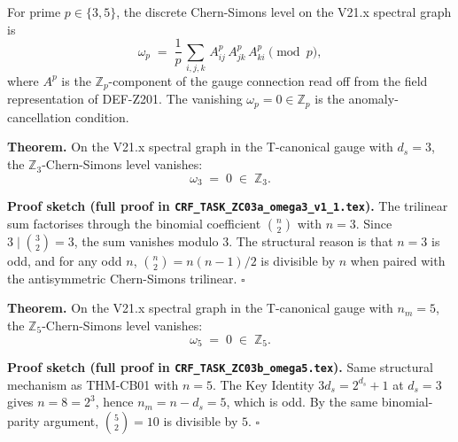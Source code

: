 \documentclass[12pt, a4paper]{article}
\begin{document}
\begin{formalbox}[title={The $\omega_p$ Anomaly Integral (Setup)}]
For prime $p \in \{3, 5\}$, the discrete Chern-Simons level on the
V21.x spectral graph is
\begin{equation}
  \omega_p
  \;=\;
  \frac{1}{p}\, \sum_{i, j, k}\,
  A^p_{ij}\, A^p_{jk}\, A^p_{ki} \pmod p,
  \label{eq:omega-p-def}
\end{equation}
where $A^p$ is the $\mathbb{Z}_p$-component of the gauge connection
read off from the field representation of DEF-Z201. The vanishing
$\omega_p = 0 \in \mathbb{Z}_p$ is the anomaly-cancellation condition.
\end{formalbox}

\begin{formalbox}[title={THM-CB01: $\omega_3 = 0 \in \mathbb{Z}_3$
  (TASK-ZC03a)}]
\textbf{Theorem.} On the V21.x spectral graph in the T-canonical
gauge with $d_s = 3$, the $\mathbb{Z}_3$-Chern-Simons level vanishes:
\begin{equation}
  \omega_3 \;=\; 0 \;\in\; \mathbb{Z}_3.
  \label{eq:THM-CB01}
\end{equation}

\textbf{Proof sketch (full proof in \texttt{CRF\_TASK\_ZC03a\_omega3\_v1\_1.tex}).}
The trilinear sum factorises through the binomial coefficient
$\binom{n}{2}$ with $n = 3$. Since $3 \mid \binom{3}{2} = 3$, the
sum vanishes modulo $3$. The structural reason is that
$n = 3$ is odd, and for any odd $n$, $\binom{n}{2} = n(n-1)/2$ is
divisible by $n$ when paired with the antisymmetric Chern-Simons
trilinear. \hfill$\square$
\end{formalbox}

\begin{formalbox}[title={THM-CB02: $\omega_5 = 0 \in \mathbb{Z}_5$
  (TASK-ZC03b)}]
\textbf{Theorem.} On the V21.x spectral graph in the T-canonical
gauge with $n_m = 5$, the $\mathbb{Z}_5$-Chern-Simons level vanishes:
\begin{equation}
  \omega_5 \;=\; 0 \;\in\; \mathbb{Z}_5.
  \label{eq:THM-CB02}
\end{equation}

\textbf{Proof sketch (full proof in \texttt{CRF\_TASK\_ZC03b\_omega5.tex}).}
Same structural mechanism as THM-CB01 with $n = 5$. The Key Identity
$3 d_s = 2^{d_s} + 1$ at $d_s = 3$ gives $n = 8 = 2^3$, hence
$n_m = n - d_s = 5$, which is odd. By the same binomial-parity
argument, $\binom{5}{2} = 10$ is divisible by $5$. \hfill$\square$
\end{formalbox}
\end{document}
